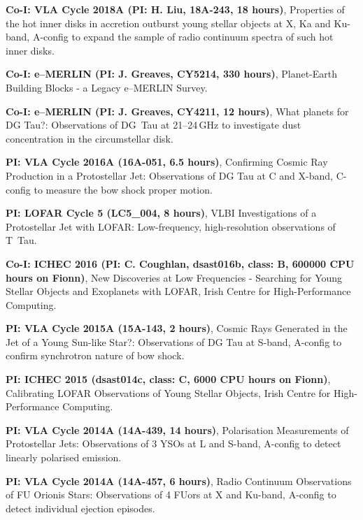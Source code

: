 
\begin{cvpubs}
  \cvpub
    {
      \begin{cvlist}
  \item {\textbf{Co-I: VLA Cycle 2018A (PI: H. Liu, 18A-243, 18 hours)}, Properties of the hot inner disks in accretion outburst young stellar objects at X, Ka and Ku-band, A-config to expand the sample of radio continuum spectra of such hot inner disks.}
  \item {\textbf{Co-I: e--MERLIN (PI: J. Greaves, CY5214, 330 hours)}, Planet-Earth Building Blocks - a Legacy e--MERLIN Survey.}
  \item {\textbf{Co-I: e--MERLIN (PI: J. Greaves, CY4211, 12 hours)}, What planets for DG Tau?: Observations of DG~Tau at 21--24\,GHz to investigate dust concentration in the circumstellar disk.}
  \item {\textbf{PI: VLA Cycle 2016A (16A-051, 6.5 hours)}, Confirming Cosmic Ray Production in a Protostellar Jet: Observations of DG Tau at C and X-band, C-config to measure the bow shock proper motion.}
  \item {\textbf{PI: LOFAR Cycle 5 (LC5\_004, 8 hours)}, VLBI Investigations of a Protostellar Jet with LOFAR: Low-frequency, high-resolution observations of T~Tau.}
    \item {\textbf{Co-I: ICHEC 2016 (PI: C. Coughlan, dsast016b, class: B, 600000 CPU hours on Fionn)}, New Discoveries at Low Frequencies - Searching for Young Stellar Objects and Exoplanets with LOFAR, Irish Centre for High-Performance Computing.}
  \item {\textbf{PI: VLA Cycle 2015A (15A-143, 2 hours)}, Cosmic Rays Generated in the Jet of a Young Sun-like Star?: Observations of DG Tau at S-band, A-config to confirm synchrotron nature of bow shock.}
  \item {\textbf{PI: ICHEC 2015 (dsast014c, class: C, 6000 CPU hours on Fionn)}, Calibrating LOFAR Observations of Young Stellar Objects, Irish Centre for High-Performance Computing.}
  \item {\textbf{PI: VLA Cycle 2014A (14A-439, 14 hours)}, Polarisation Measurements of Protostellar Jets: Observations of 3 YSOs at L and S-band, A-config to detect linearly polarised emission.}
  \item {\textbf{PI: VLA Cycle 2014A (14A-457, 6 hours)}, Radio Continuum Observations of FU Orionis Stars: Observations of 4 FUors at X and Ku-band, A-config to detect individual ejection episodes.}

\end{cvlist}}
\end{cvpubs}
